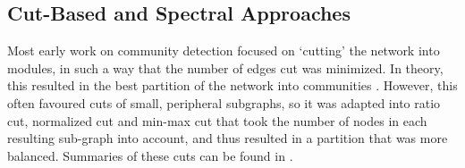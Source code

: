 \documentclass{article}
\begin{document}
\subsection{Cut-Based and Spectral Approaches}
Most early work on community detection focused on `cutting' the network into modules, in such a way that the number of edges cut was minimized. 
In theory, this resulted in the best partition of the network into communities \cite{kernighan1970efficient}.
However, this often favoured cuts of small, peripheral subgraphs, so it was adapted into ratio cut, normalized cut and min-max cut that took the number of nodes in each resulting sub-graph into account, and thus resulted in a partition that was more balanced.
Summaries of these cuts can be found in \cite{fortunato2010community}.

\end{document}
